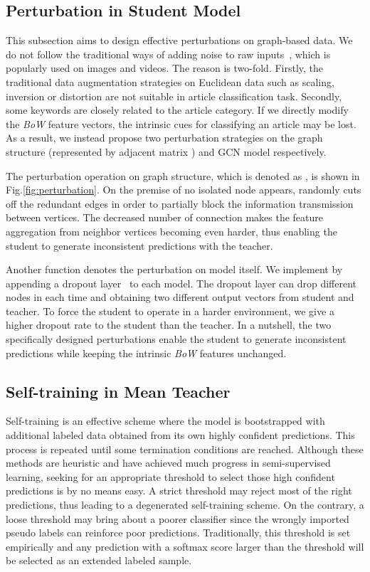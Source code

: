 \documentclass[letterpaper]{article} \usepackage{aaai19}  \usepackage{times}  \usepackage{helvet}  \usepackage{courier}  \usepackage{url}  \usepackage{graphicx}  \usepackage{algorithm}
\begin{document}
\subsection{Perturbation in Student Model} \label{sec:perturbation}
This subsection aims to design effective perturbations on graph-based data. We do not follow the traditional ways of adding noise to raw inputs~\cite{french2017self}, which is popularly used on images and videos. The reason is two-fold. Firstly, the traditional data augmentation strategies on Euclidean data such as scaling, inversion or distortion are not suitable in article classification task. Secondly, some keywords are closely related to the article category. If we directly modify the \emph{BoW} feature vectors, the intrinsic cues for classifying an article may be lost. As a result, we instead propose two perturbation strategies on the graph structure (represented by adjacent matrix ) and GCN model respectively. 

The perturbation operation on graph structure, which is denoted as , is shown in Fig.\ref{fig:perturbation}. On the premise of no isolated node appears,  randomly cuts off the redundant edges in order to partially block the information transmission between vertices. The decreased number of connection makes the feature aggregation from neighbor vertices becoming even harder, thus enabling the student to generate inconsistent predictions with the teacher.  

Another function  denotes the perturbation on model itself. We implement  by appending a dropout layer~\cite{srivastava2014dropout} to each model. The dropout layer can drop different nodes in each time and obtaining two different output vectors from student and teacher. To force the student to operate in a harder environment, we give a higher dropout rate to the student than the teacher.  
In a nutshell, the two specifically designed perturbations enable the student to generate inconsistent predictions while keeping the intrinsic \emph{BoW} features unchanged. 

\subsection{Self-training in Mean Teacher}
Self-training is an effective scheme where the model is bootstrapped with additional labeled data obtained from its own highly confident predictions. This process is repeated until some termination conditions are reached. Although these methods are heuristic and have achieved much progress in semi-supervised learning, seeking for an appropriate threshold to select those high confident predictions is by no means easy. A strict threshold may reject most of the right predictions, thus leading to a degenerated self-training scheme. On the contrary, a loose threshold may bring about a poorer classifier since the wrongly imported pseudo labels can reinforce poor predictions. Traditionally, this threshold is set empirically and any prediction with a softmax score larger than the threshold will be selected as an extended labeled sample.
\end{document}
